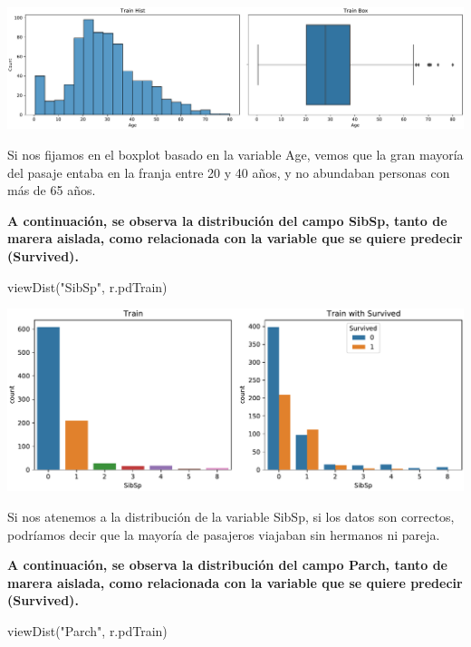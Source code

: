 \documentclass[
]{article}
\newenvironment{Shaded}{\begin{snugshade}}{\end{snugshade}}
\newcommand{\NormalTok}[1]{\textcolor[rgb]{0.80,0.80,0.80}{#1}}
\newcommand{\StringTok}[1]{\textcolor[rgb]{0.80,0.58,0.58}{#1}}
\begin{document}
\includegraphics{m2851_PRA2_aruizplaza_rcotillas_files/figure-latex/unnamed-chunk-8-1.pdf}

Si nos fijamos en el boxplot basado en la variable Age, vemos que la
gran mayoría del pasaje entaba en la franja entre 20 y 40 años, y no
abundaban personas con más de 65 años.

\textbf{A continuación, se observa la distribución del campo SibSp,
tanto de marera aislada, como relacionada con la variable que se quiere
predecir (Survived).}

\begin{Shaded}
\begin{Highlighting}[]
\NormalTok{viewDist(}\StringTok{"SibSp"}\NormalTok{, r.pdTrain)}
\end{Highlighting}
\end{Shaded}

\includegraphics{m2851_PRA2_aruizplaza_rcotillas_files/figure-latex/unnamed-chunk-9-1.pdf}

Si nos atenemos a la distribución de la variable SibSp, si los datos son
correctos, podríamos decir que la mayoría de pasajeros viajaban sin
hermanos ni pareja.

\textbf{A continuación, se observa la distribución del campo Parch,
tanto de marera aislada, como relacionada con la variable que se quiere
predecir (Survived).}

\begin{Shaded}
\begin{Highlighting}[]
\NormalTok{viewDist(}\StringTok{"Parch"}\NormalTok{, r.pdTrain)}
\end{Highlighting}
\end{Shaded}
\end{document}
